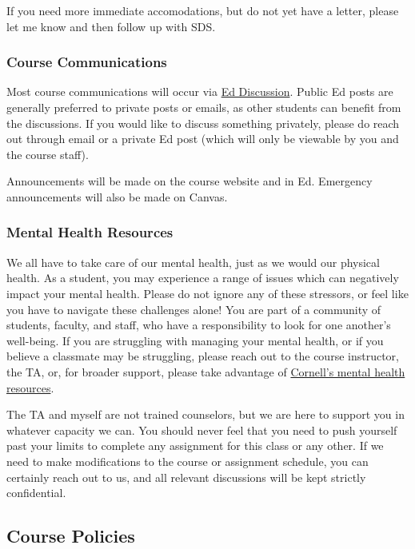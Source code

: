 \documentclass[
  letterpaper,
  DIV=11,
  numbers=noendperiod]{scrartcl}
\begin{document}
If you need more immediate accomodations, but do not yet have a letter,
please let me know and then follow up with SDS.

\hypertarget{course-communications}{%
\subsubsection{Course Communications}\label{course-communications}}

Most course communications will occur via \href{https://edstem.org}{Ed
Discussion}. Public Ed posts are generally preferred to private posts or
emails, as other students can benefit from the discussions. If you would
like to discuss something privately, please do reach out through email
or a private Ed post (which will only be viewable by you and the course
staff).

Announcements will be made on the course website and in Ed. Emergency
announcements will also be made on Canvas.

\hypertarget{mental-health-resources}{%
\subsubsection{Mental Health Resources}\label{mental-health-resources}}

We all have to take care of our mental health, just as we would our
physical health. As a student, you may experience a range of issues
which can negatively impact your mental health. Please do not ignore any
of these stressors, or feel like you have to navigate these challenges
alone! You are part of a community of students, faculty, and staff, who
have a responsibility to look for one another's well-being. If you are
struggling with managing your mental health, or if you believe a
classmate may be struggling, please reach out to the course instructor,
the TA, or, for broader support, please take advantage of
\href{https://mentalhealth.cornell.edu/}{Cornell's mental health
resources}.

The TA and myself are not trained counselors, but we are here to support
you in whatever capacity we can. You should never feel that you need to
push yourself past your limits to complete any assignment for this class
or any other. If we need to make modifications to the course or
assignment schedule, you can certainly reach out to us, and all relevant
discussions will be kept strictly confidential.

\hypertarget{course-policies}{%
\subsection{Course Policies}\label{course-policies}}
\end{document}
